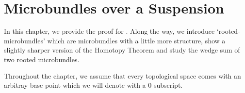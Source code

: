 \chapter{Microbundles over a Suspension}\label{chapter::suspension}
\begin{myparagraph}
    In this chapter, we provide the proof for .
    Along the way, we introduce `rooted-microbundles' which are
    microbundles with a little more structure, show a slightly sharper version of
    the Homotopy Theorem and study the wedge sum of two rooted microbundles.

    Throughout the chapter,
    we assume that every topological space comes with an arbitray base point which
    we will denote with a $0$ subscript.
\end{myparagraph}








